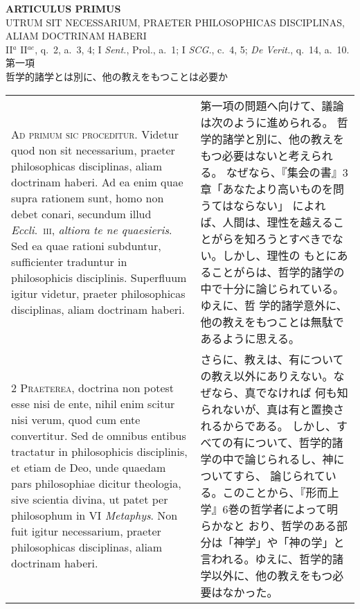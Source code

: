 \documentclass[10pt]{jsarticle} %
\begin{document}
\newpage

\begin{center}
 {\Large {\bf ARTICULUS PRIMUS}}\\
 {\large UTRUM SIT NECESSARIUM, PRAETER PHILOSOPHICAS
 DISCIPLINAS,\\ALIAM DOCTRINAM HABERI}\\
 {\footnotesize II$^a$ II$^{ae}$, q.~2, a.~3, 4; I {\itshape Sent.},
 Prol., a.~1; I {\itshape SCG.}, c.~4, 5; {\itshape De Verit.}, q.~14, a.~10.}\\
 {\Large 第一項\\哲学的諸学とは別に、他の教えをもつことは必要か}
\end{center}

\begin{longtable}{p{21em}p{21em}}
{\huge A}{\scshape d primum sic proceditur}. Videtur quod non sit
necessarium, praeter philosophicas disciplinas, aliam doctrinam
haberi. Ad ea enim quae supra rationem sunt, homo non debet conari,
secundum illud {\itshape Eccli}.~{\scshape iii}, {\itshape altiora te ne
quaesieris}. Sed ea quae rationi subduntur, sufficienter traduntur in
philosophicis disciplinis. Superfluum igitur videtur, praeter
philosophicas disciplinas, aliam doctrinam haberi.

&

第一項の問題へ向けて、議論は次のように進められる。
哲学的諸学と別に、他の教えをもつ必要はないと考えられる。
なぜなら、『集会の書』3章「あなたより高いものを問うてはならない」 によれ
 ば、人間は、理性を越えることがらを知ろうとすべきでない。しかし、理性の
 もとにあることがらは、哲学的諸学の中で十分に論じられている。ゆえに、哲
 学的諸学意外に、他の教えをもつことは無駄であるように思える。

\\

{\scshape 2 Praeterea}, doctrina non potest esse nisi de ente, nihil
enim scitur nisi verum, quod cum ente convertitur. Sed de omnibus
entibus tractatur in philosophicis disciplinis, et etiam de Deo, unde
quaedam pars philosophiae dicitur theologia, sive scientia divina, ut
patet per philosophum in VI {\itshape Metaphys}. Non fuit igitur
necessarium, praeter philosophicas disciplinas, aliam doctrinam haberi.


&
さらに、教えは、有についての教え以外にありえない。なぜなら、真でなければ
 何も知られないが、真は有と置換されるからである。
しかし、すべての有について、哲学的諸学の中で論じられるし、神についてすら、
 論じられている。このことから、『形而上学』6巻の哲学者によって明らかなと
 おり、哲学のある部分は「神学」や「神の学」と言われる。ゆえに、哲学的諸
 学以外に、他の教えをもつ必要はなかった。



\end{longtable}
\end{document}
